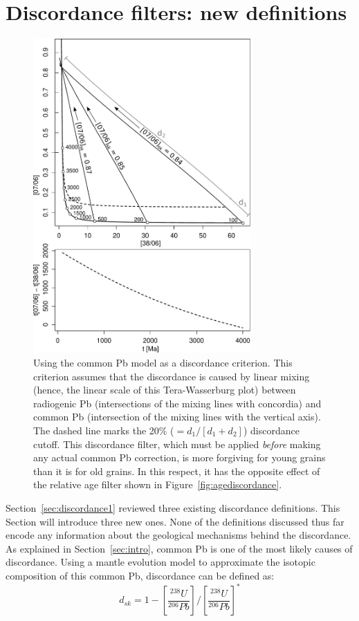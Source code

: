 \documentclass[gchron, manuscript]{copernicus}
\begin{document}
\section{Discordance filters: new definitions}\label{sec:discordance2}

\begin{figure}
  \includegraphics[width=8.3cm]{TW-option-linear-3.pdf}
    \caption{Using the \citet{stacey1975} common Pb model as a
      discordance criterion. This criterion assumes that the
      discordance is caused by linear mixing (hence, the linear scale
      of this Tera-Wasserburg plot) between radiogenic Pb
      (intersections of the mixing lines with concordia) and common Pb
      (intersection of the mixing lines with the vertical axis). The
      dashed line marks the 20\% ($= d_1/[d_1+d_2]$) discordance
      cutoff. This discordance filter, which must be applied
      \emph{before} making any actual common Pb correction, is more
      forgiving for young grains than it is for old grains. In this
      respect, it has the opposite effect of the relative age filter
      shown in Figure~\ref{fig:agediscordance}.
    }
    \label{fig:SK}
\end{figure}

Section~\ref{sec:discordance1} reviewed three existing discordance
definitions.  This Section will introduce three new ones.  None of the
definitions discussed thus far encode any information about the
geological mechanisms behind the discordance. As explained in
Section~\ref{sec:intro}, common Pb is one of the most likely causes of
discordance. Using a mantle evolution model \citep[e.g.][]{stacey1975}
to approximate the isotopic composition of this common Pb, discordance
can be defined as:
\begin{equation}
  d_{sk} = 1 - \left[\frac{{}^{238}U}{{}^{206}Pb}\right]\bigg/\left[\frac{{}^{238}U}{{}^{206}Pb}\right]^\ast
  \label{eq:dsk}
\end{equation}
\end{document}
